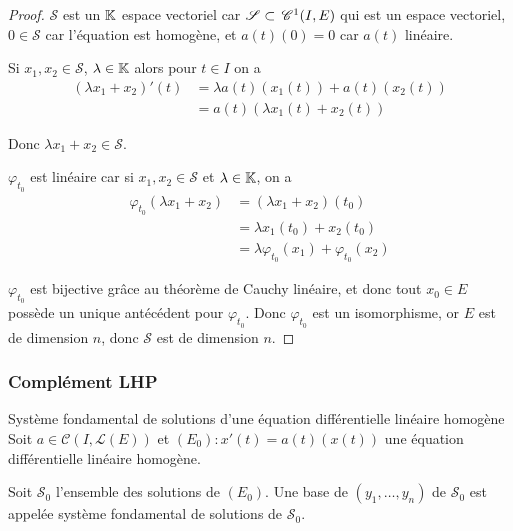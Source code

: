 \begin{proof}
    $\mathscr S$ est un $\mathbb{K}$ espace vectoriel car $\mathscr S \subset \,\mathscr C^{1}(I, E)$ 
    qui est un espace vectoriel, $0 \in \mathscr S$ car l'équation est homogène, et $a(t)(0) = 0$ car 
    $a(t)$ linéaire. 

    Si $x_1, x_2 \in \mathscr S$, $\lambda \in \mathbb{K}$ alors pour $t \in I$ on a 
    \begin{align}
        (\lambda x_1 + x_2)'(t) & = \lambda a(t)(x_1(t)) + a(t)(x_2(t)) \\
        & = a(t)(\lambda x_1(t) + x_2(t))
    \end{align}

    Donc $\lambda x_1 + x_2 \in \mathscr S$.

    $\varphi_{t_0}$ est linéaire car si $x_1, x_2 \in \mathscr S$ et $\lambda \in \mathbb{K}$, on a 
    \begin{align}
        \varphi_{t_0}(\lambda x_1 + x_2) & = (\lambda x_1 + x_2)(t_0) \\
        & = \lambda x_1(t_0) + x_2(t_0) \\
        & = \lambda \varphi_{t_0}(x_1) + \varphi_{t_0}(x_2)
    \end{align}

    $\varphi_{t_0}$ est bijective grâce au théorème de Cauchy linéaire, et donc tout $x_0 \in E$
    possède un unique antécédent pour $\varphi_{t_0}$. Donc $\varphi_{t_0}$ est un isomorphisme, or 
    $E$ est de dimension $n$, donc $\mathscr S$ est de dimension $n$.
\end{proof}

\subsubsection{Complément LHP}

\begin{definitionnt}{Système fondamental de solutions d'une équation différentielle linéaire homogène}{}
    Soit $a \in \mathscr C(I, \mathscr L(E))$ et 
    $(E_0) : x'(t) = a(t)(x(t))$ une équation différentielle linéaire homogène.

    Soit $\mathscr S_0$ l'ensemble des solutions de $(E_0)$. Une base de 
    $(y_1, \dots, y_n)$ de $\mathscr S_0$ est appelée système fondamental de solutions de $\mathscr S_0$.
\end{definitionnt}

